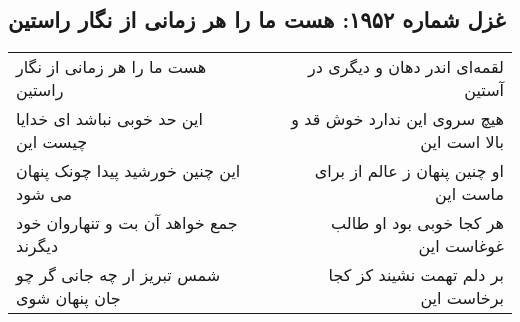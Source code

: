 \begin{center}
\section*{غزل شماره ۱۹۵۲: هست ما را هر زمانی از نگار راستین}
\label{sec:1952}
\begin{longtable}{l p{0.5cm} r}
هست ما را هر زمانی از نگار راستین
&&
لقمه‌ای اندر دهان و دیگری در آستین
\\
این حد خوبی نباشد ای خدایا چیست این
&&
هیچ سروی این ندارد خوش قد و بالا است این
\\
این چنین خورشید پیدا چونک پنهان می شود
&&
او چنین پنهان ز عالم از برای ماست این
\\
جمع خواهد آن بت و تنهاروان خود دیگرند
&&
هر کجا خوبی بود او طالب غوغاست این
\\
شمس تبریز ار چه جانی گر چو جان پنهان شوی
&&
بر دلم تهمت نشیند کز کجا برخاست این
\\
\end{longtable}
\end{center}
